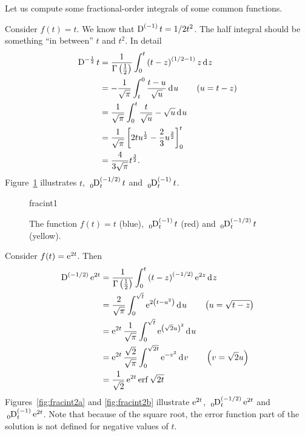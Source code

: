     Let us compute some fractional-order integrals of some common functions.

    \begin{example}
      Consider $f(t) = t$. We know that $\tensor*[]{\D}{^{(-1)}}t = 1/2 t^2$. The half integral should be something ``in between'' $t$ and $t^2$. In detail
      \begin{align*}
	\tensor*[]{\D}{^{-\frac{1}{2}}} t &= \frac{1}{\Gamma \left( \frac{1}{2} \right)} \int_0^t \left( t - z \right)^{\left( 1/2 - 1 \right)} z \d z \\
	&= -\frac{1}{\sqrt{\pi}} \int_t^0 \frac{t - u}{\sqrt{u}} \d u \qquad \left(u = t - z \right)\\
	&= \frac{1}{\sqrt{\pi}} \int_0^t \frac{t}{\sqrt{u}} - \sqrt{u} \d u \\
	&= \frac{1}{\sqrt{\pi}} \left[ 2 t u^\frac{1}{2} - \frac{2}{3} u^\frac{3}{2} \right]_0^t \\
	&= \frac{4}{3 \sqrt{\pi}} t^\frac{3}{2}.
	\label{ex:fracint1}
      \end{align*}
      Figure~\ref{fig:fracint1} illustrates $t$, $\tensor*[_0]{\D}{^{\left( -1/2 \right)}_t} t$ and $\tensor*[_0]{\D}{^{(-1)}_t} t$.
      \label{ex:fracint1}
    \end{example}

    \begin{figure}
      \centering
      {fracint1}
      \caption{The function $f(t) = t$ (blue), $\tensor*[_0]{\D}{^{(-1)}_t}t$ (red) and $\tensor*[_0]{\D}{^{(-1/2)}_t} t$ (yellow).}
      \label{fig:fracint1}
    \end{figure}

    \begin{example}
      Consider $f(t) = \operatorname{e}^{ 2 t }$. Then
      \begin{align*}
	\tensor*[]{\D}{^{\left(-1/2\right)}} \e^{2 t} &= \frac{1}{\Gamma \left( \frac{1}{2} \right)} \int_0^t \left( t - z \right)^{(-1/2)} \e^{2 z} \d z \\
	&= \frac{2}{\sqrt{\pi}} \int_0^{\sqrt{t}} \e^{ 2 \left( t - u^2 \right) } \d u \qquad \left( u = \sqrt{t - z} \right) \\
	&= \e^{2 t} \frac{1}{\sqrt{\pi}} \int_0^{\sqrt{t}} \e^{\left( \sqrt{2} u \right)^2} \d u \\
	&= \e^{2 t} \frac{\sqrt{2}}{\sqrt{\pi}} \int_0^{\sqrt{2 t}} \e^{-v^2} \d v \qquad \left( v = \sqrt{2} u \right) \\
	&= \frac{1}{\sqrt{2}} \e^{2 t} \erf{\sqrt{2 t}}
      \end{align*}
      Figures~\ref{fig:fracint2a} and \ref{fig:fracint2b} illustrate $\operatorname{e}^{2 t}$, $\tensor*[_0]{\D}{^{\left( -1/2 \right)}_t} \e^{2 t}$ and $\tensor*[_0]{\D}{^{(-1)}_t} \e^{2 t}$. Note that because of the square root, the error function part of the solution is not defined for negative values of $t$.
    \end{example}

